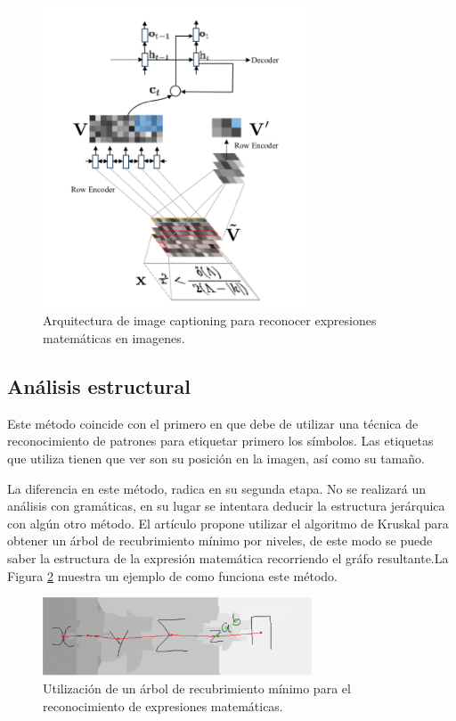     \begin{figure}
		\centering
		\includegraphics[width=8cm]{capitulo2/images/imgcaptioning}
		\caption{Arquitectura de image captioning para reconocer expresiones matemáticas en imagenes.}
		\label{fig:imgcaptioning}
    \end{figure}
    
    
\subsection{Análisis estructural}

Este método coincide con el primero en que debe de utilizar una técnica de reconocimiento de patrones para etiquetar primero los símbolos. Las etiquetas que utiliza tienen que ver son su posición en la imagen, así como su tamaño. 

La diferencia en este método, radica en su segunda etapa. No se realizará un análisis con gramáticas, en su lugar se intentara deducir la estructura jerárquica con algún otro método. El artículo \cite{spanningtree} propone utilizar el algoritmo de Kruskal para obtener un árbol de recubrimiento mínimo por niveles, de este modo se puede saber la estructura de la expresión matemática recorriendo el gráfo resultante.La Figura \ref{fig:spanningtree} muestra un ejemplo de como funciona este método.

\begin{figure}[h]
	\centering
	\includegraphics[width=8cm]{capitulo2/images/spanningtree}
	\caption{Utilización de un árbol de recubrimiento mínimo para el reconocimiento de expresiones matemáticas.}
	\label{fig:spanningtree}
\end{figure}


